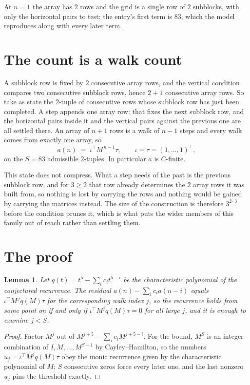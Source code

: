 \documentclass[11pt,a4paper]{article}
\theoremstyle{plain}
\newtheorem{lemma}[theorem]{Lemma}
\theoremstyle{definition}
\begin{document}
At $n=1$ the array has $2$ rows and the grid is a single row of $2$
subblocks, with only the horizontal pairs to test; the entry's first term is
$83$, which the model reproduces along with every later term.

\section{The count is a walk count}

A subblock row is fixed by $2$ consecutive array rows, and the vertical condition compares
two consecutive subblock rows, hence $2+1$ consecutive array rows. So take as state the
$2$-tuple of consecutive rows whose subblock row has just been completed. A step appends one
array row: that fixes the next subblock row, and the horizontal pairs inside it and the
vertical pairs against the previous one are all settled there. An array of $n+1$ rows is
a walk of $n-1$ steps and every walk comes from exactly one array, so
\[
a(n)\;=\;\iota^{\!\top}M^{\,n-1}\tau,\qquad\iota=\tau=(1,\dots,1)^{\!\top},
\]
on the $S=83$ admissible $2$-tuples. In particular $a$ is $C$-finite.

This state does not compress. What a step needs of the past is the previous subblock row, and
for $3\ge2$ that row already determines the $2$ array rows it was built from, so nothing
is lost by carrying the rows and nothing would be gained by carrying the matrices instead. The
size of the construction is therefore $3^{2\cdot3}$ before the condition prunes
it, which is what puts the wider members of this family out of reach rather than settling them.

\section{The proof}

\begin{lemma}\label{lem:crit}
Let $q(t)=t^{5}-\sum_i c_it^{5-i}$ be the characteristic polynomial of the
conjectured recurrence. The residual $a(n)-\sum_ic_ia(n-i)$ equals
$\iota^{\!\top}M^{\,j}q(M)\tau$ for the corresponding walk index $j$, so the recurrence
holds from some point on if and only if $\iota^{\!\top}M^{j}q(M)\tau=0$ for all large $j$,
and it is enough to examine $j<S$.
\end{lemma}

\begin{proof}
Factor $M^{j}$ out of $M^{j+5}-\sum_ic_iM^{j+5-i}$. For the bound, $M^{S}$
is an integer combination of $I,M,\dots,M^{S-1}$ by Cayley--Hamilton, so the numbers
$u_j=\iota^{\!\top}M^{j}q(M)\tau$ obey the monic recurrence given by the characteristic
polynomial of $M$; $S$ consecutive zeros force every later one, and the last nonzero $u_j$
pins the threshold exactly.
\end{proof}
\end{document}

